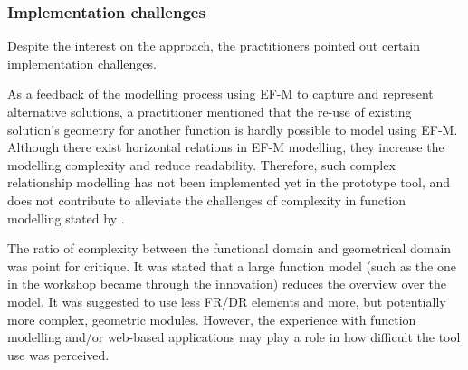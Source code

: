 \documentclass[aerospace,article,submit,moreauthors,pdftex]{Definitions/mdpi}
\begin{document}


\subsubsection{Implementation challenges }

Despite the interest on the approach, the practitioners pointed out certain implementation challenges.


As a feedback of the modelling process using \ac{EF-M} to capture and represent alternative solutions, a practitioner mentioned that the re-use of existing solution's geometry for another function is hardly possible to model using EF-M.
Although there exist horizontal relations in EF-M modelling, they increase the modelling complexity and reduce readability.
Therefore, such complex relationship modelling has not been implemented yet in the prototype tool, and does not contribute to alleviate the challenges of complexity in function modelling stated by \cite{Muller2020, Tomiyama2013}.

The ratio of complexity between the functional domain and geometrical domain was point for critique.
It was stated that a large function model (such as the one in the workshop became through the innovation) reduces the overview over the model.
It was suggested to use less FR/DR elements and more, but potentially more complex, geometric modules.
However, the experience with function modelling and/or web-based applications may play a role in how difficult the tool use was perceived.
\end{document}
